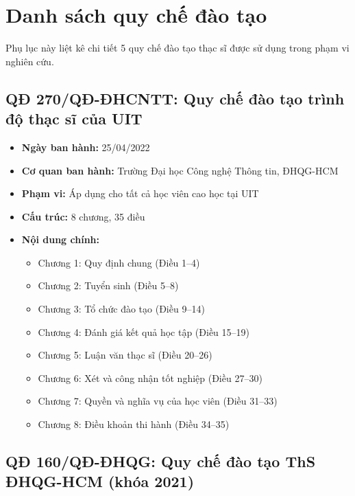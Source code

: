 \chapter{Danh sách quy chế đào tạo}
\label{app:quy-che-dao-tao}

Phụ lục này liệt kê chi tiết 5 quy chế đào tạo thạc sĩ được sử dụng trong phạm vi nghiên cứu.

\section{QĐ 270/QĐ-ĐHCNTT: Quy chế đào tạo trình độ thạc sĩ của UIT}
\label{sec:app-qd270}

\begin{itemize}
  \item \textbf{Ngày ban hành:} 25/04/2022
  \item \textbf{Cơ quan ban hành:} Trường Đại học Công nghệ Thông tin, ĐHQG-HCM
  \item \textbf{Phạm vi:} Áp dụng cho tất cả học viên cao học tại UIT
  \item \textbf{Cấu trúc:} 8 chương, 35 điều
  \item \textbf{Nội dung chính:}
  \begin{itemize}
    \item[--] Chương 1: Quy định chung (Điều 1--4)
    \item[--] Chương 2: Tuyển sinh (Điều 5--8)
    \item[--] Chương 3: Tổ chức đào tạo (Điều 9--14)
    \item[--] Chương 4: Đánh giá kết quả học tập (Điều 15--19)
    \item[--] Chương 5: Luận văn thạc sĩ (Điều 20--26)
    \item[--] Chương 6: Xét và công nhận tốt nghiệp (Điều 27--30)
    \item[--] Chương 7: Quyền và nghĩa vụ của học viên (Điều 31--33)
    \item[--] Chương 8: Điều khoản thi hành (Điều 34--35)
  \end{itemize}
\end{itemize}

\section{QĐ 160/QĐ-ĐHQG: Quy chế đào tạo ThS ĐHQG-HCM (khóa 2021)}
\label{sec:app-qd160}

